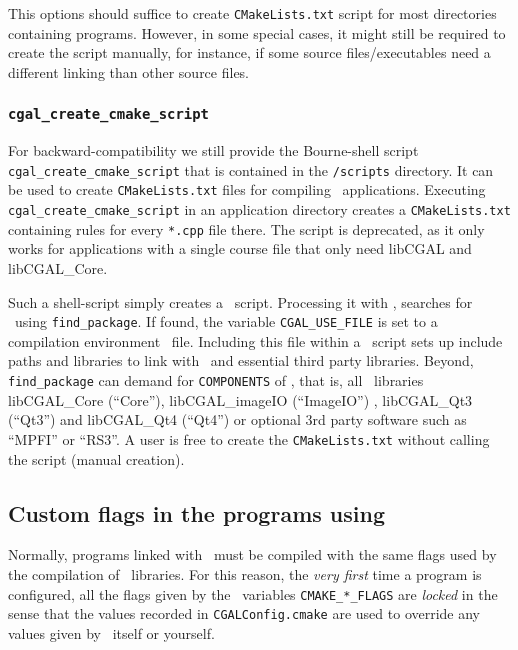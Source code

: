 This options should suffice to create \texttt{CMakeLists.txt} script
for most directories containing programs. However, in some special
cases, it might still be required to create the script manually, for
instance, if some source files/executables need a different linking than
other source files. 

\begin{ccDeprecated}
\subsubsection{\texttt{cgal\_create\_cmake\_script\label{sec:create_cgal_cmake_script}}}

For backward-compatibility we still provide the 
Bourne-shell script \texttt{cgal\_create\_cmake\_script} that 
is contained in the
\texttt{\cgalrel/scripts} directory. It can be used to create
\texttt{CMakeLists.txt} files for compiling \cgal\ applications. Executing
\texttt{cgal\_create\_cmake\_script} in an application directory creates a
\texttt{CMakeLists.txt} containing rules for every \texttt{*.cpp} file
there. The script is deprecated, as it only works for applications 
with a single course file that only need libCGAL and libCGAL\_Core.
\end{ccDeprecated}

Such a shell-script simply creates a \cmake\ script. Processing it
with \cmake, searches for \cgal\ using \texttt{find\_package}. If found,
the variable \texttt{CGAL\_USE\_FILE} is set to a compilation environment \cmake\ file. Including
this file within a \cmake\ script sets up include paths and libraries to
link with \cgal\ and essential third party libraries. Beyond,
\texttt{find\_package} can demand for \texttt{COMPONENTS} of \cgal,
that is, all \cgal\ libraries libCGAL\_Core (``Core''),
libCGAL\_imageIO (``ImageIO'') , libCGAL\_Qt3 (``Qt3'') and libCGAL\_Qt4
(``Qt4'') or optional 3rd party software such as ``MPFI'' or ``RS3''.
A user is free to create the \texttt{CMakeLists.txt}
without calling the script (manual creation).


\subsection{Custom flags in the programs using \cgal}

Normally, programs linked with \cgal\ must be compiled with the same flags
used by the compilation of \cgal\
libraries. For this reason, the \emph{very first} time
a program is configured, all the flags given by the \cmake\ variables \texttt{CMAKE\_*\_FLAGS}
are \emph{locked} in the sense that the values recorded in \texttt{CGALConfig.cmake} 
are used to override any values given by \cmake\ itself or yourself.

